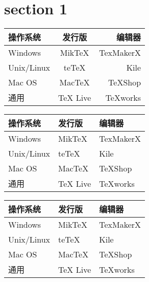 \documentclass[12pt]{article}
\begin{document}
    \section{section 1}
        \begin{tabular}{|l|c|r|}    %
            \hline
            操作系统 & 发行版 & 编辑器 \\
            \hline
            Windows & MikTeX & TexMakerX \\
            \hline
            Unix/Linux & teTeX & Kile \\
            \hline
            Mac OS & MacTeX & TeXShop \\
            \hline
             通用 & TeX Live & TeXworks \\
            \hline
    \end{tabular}

    \begin{table}[htbp]
        \centering
        \begin{tabular}{lll}
            \toprule
            操作系统 & 发行版 & 编辑器 \\
            \midrule
            Windows & MikTeX & TexMakerX \\
            Unix/Linux & teTeX & Kile \\
            Mac OS & MacTeX & TeXShop \\
            通用 & TeX Live & TeXworks \\
            \bottomrule
        \end{tabular}
    \end{table}
    
    \begin{table}[htbp]
        \centering
        \begin{tabular}{p{80pt}p{80pt}p{70pt}}
            \toprule
            操作系统 & 发行版 & 编辑器 \\
            \midrule
            Windows & MikTeX & TexMakerX \\
            Unix/Linux & teTeX & Kile \\
            Mac OS & MacTeX & TeXShop \\
            通用 & TeX Live & TeXworks \\
            \bottomrule
        \end{tabular}
    \end{table}
    
\end{document}
